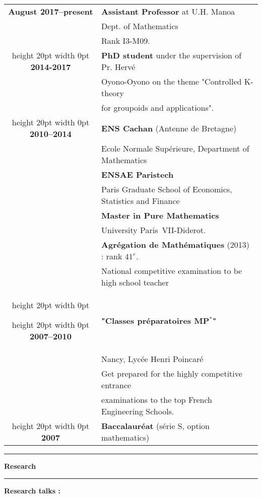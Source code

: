 \documentclass[a4paper,11pt]{article}
\newcommand\espace{\vrule height 20pt width 0pt}
\newcommand{\titre}[1]{%
	\begin{center}
	\bigskip
	\rule{\textwidth}{1pt}
	\par\vspace{0.1cm}
        \textbf{\large #1}
	\par\rule{\textwidth}{1pt}
	\end{center}
	\bigskip
	}
\begin{document}
\begin{tabular}{cp{}}

\textbf{August 2017--present} &  \textbf{Assistant Professor} at U.H. Manoa  \\
						& Dept. of Mathematics\\
						& Rank I3-M09. \\
\espace
\textbf{2014-2017} &  \textbf{PhD student} under the supervision of Pr. Hervé  \\
						& Oyono-Oyono on the theme "Controlled K-theory \\
						& for groupoids and applications". \\
\espace
\textbf{2010--2014} &  \textbf{ENS Cachan} (Antenne de Bretagne) \\
				    & 	Ecole Normale Supérieure, Department of Mathematics \\
                              & \textbf{ENSAE Paristech}\\
				&	Paris Graduate School of Economics, Statistics and Finance\\
                                   & \textbf{Master in Pure Mathematics}\\  & University Paris~VII-Diderot. \\
                                   & \textbf{Agrégation de Mathématiques} (2013) : rank $41^e$. \\
				& National competitive examination to be high school teacher\\
\espace

\espace
\textbf{2007--2010} &\textbf{ "Classes préparatoires MP$^*$" } \\
					& Nancy, Lycée Henri Poincaré\\
					& Get prepared for the highly competitive entrance \\
				& examinations to the top French Engineering Schools.\\

\espace
\textbf{2007} & \textbf{Baccalauréat} (série S, option mathematics) 
 \\

\end{tabular}


\titre{Research}

\textbf{Research talks :}\\
\end{document}
